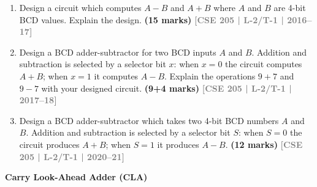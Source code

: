\documentclass[12pt,a4paper]{article}
\newcommand{\yr}[1]{\hfill\textcolor{gray}{\small\textbf{[#1]}}}
\newcommand{\mk}[1]{\textcolor{orange!70!black}{\small\textbf{(#1 marks)}}}
\newcommand{\subtopic}[2]{%
  \vspace{10pt}
  \noindent\begin{tcolorbox}[colback=#1!8,colframe=#1,boxrule=0.6pt,arc=4pt,
    left=6pt,right=6pt,top=4pt,bottom=4pt]
    \small\bfseries\textcolor{#1}{#2}
  \end{tcolorbox}
  \vspace{2pt}
}
\begin{document}
\begin{enumerate}

\item Design a circuit which computes $A - B$ and $A + B$ where $A$ and $B$ are 4-bit BCD values. Explain the design.
\mk{15} \yr{CSE 205 | L-2/T-1 | 2016--17}

\item Design a BCD adder-subtractor for two BCD inputs $A$ and $B$. Addition and subtraction is selected by a selector bit $x$: when $x=0$ the circuit computes $A+B$; when $x=1$ it computes $A-B$. Explain the operations $9+7$ and $9-7$ with your designed circuit.
\mk{9+4} \yr{CSE 205 | L-2/T-1 | 2017--18}

\item Design a BCD adder-subtractor which takes two 4-bit BCD numbers $A$ and $B$. Addition and subtraction is selected by a selector bit $S$: when $S=0$ the circuit produces $A+B$; when $S=1$ it produces $A-B$.
\mk{12} \yr{CSE 205 | L-2/T-1 | 2020--21}

\end{enumerate}

\subtopic{cD}{Carry Look-Ahead Adder (CLA)}
\label{sub:s4-cla}
\end{document}
